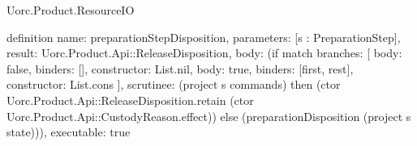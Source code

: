 \begin{lexlean}{Uorc.Product.ResourceIO}
\begin{semanticmodule}
definition{
  name: preparationStepDisposition,
  parameters: [s : PreparationStep],
  result: Uorc.Product.Api::ReleaseDisposition,
  body: (if match{
    branches: [
      {body: false, binders: [], constructor: List.nil},
      {body: true, binders: [first, rest], constructor: List.cons}
    ],
    scrutinee: (project s commands)
  } then (ctor Uorc.Product.Api::ReleaseDisposition.retain (ctor Uorc.Product.Api::CustodyReason.effect)) else (preparationDisposition (project s state))),
  executable: true
}
\end{semanticmodule}
\end{lexlean}
